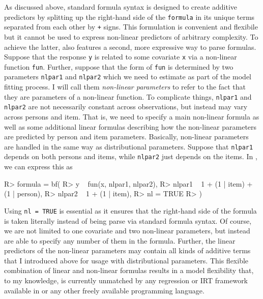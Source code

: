 \documentclass[jss]{jss}
\begin{document}
As discussed above, standard  formula syntax is designed to
create additive predictors by splitting up the right-hand side of the
\texttt{formula} in its unique terms separated from each other by
\texttt{+} signs. This formulation is convenient and flexibile but it
cannot be used to express non-linear predictors of arbitrary complexity.
To achieve the latter,  also features a second, more
expressive way to parse  formulas. Suppose that the response
\texttt{y} is related to some covariate \texttt{x} via a non-linear
function \texttt{fun}. Further, suppose that the form of \texttt{fun} is
determined by two parameters \texttt{nlpar1} and \texttt{nlpar2} which
we need to estimate as part of the model fitting process. I will call
them \emph{non-linear parameters} to refer to the fact that they are
parameters of a non-linear function. To complicate things,
\texttt{nlpar1} and \texttt{nlpar2} are not necessarily constant across
observations, but instead may vary across persons and item. That is, we
need to specify a main non-linear formula as well as some additional
linear formulas describing how the non-linear parameters are predicted
by person and item parameters. Basically, non-linear parameters are
handled in the same way as distributional parameters. Suppose that
\texttt{nlpar1} depends on both persons and items, while \texttt{nlpar2}
just depends on the items. In , we can express this as

\begin{CodeChunk}

\begin{CodeInput}
R> formula = bf(
R>   y ~ fun(x, nlpar1, nlpar2),
R>   nlpar1 ~ 1 + (1 | item) + (1 | person),
R>   nlpar2 ~ 1 + (1 | item),
R>   nl = TRUE
R> )
\end{CodeInput}
\end{CodeChunk}

Using \texttt{nl\ =\ TRUE} is essential as it ensures that the
right-hand side of the formula is taken literally instead of being parse
via standard  formula syntax. Of course, we are not limited
to one covariate and two non-linear parameters, but instead are able to
specify any number of them in the formula. Further, the linear
predictors of the non-linear parameters may contain all kinds of
additive terms that I introduced above for usage with distributional
parameters. This flexible combination of linear and non-linear formulas
results in a model flexibility that, to my knowledge, is currently
unmatched by any regression or IRT framework available in 
or any other freely available programming language.
\end{document}
